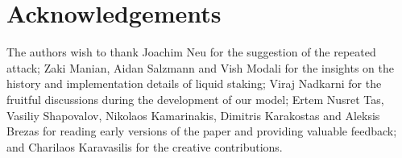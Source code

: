 \section{Acknowledgements}

The authors wish to thank Joachim Neu for the suggestion of the repeated attack;
Zaki Manian, Aidan Salzmann and Vish Modali for the insights on the history and
implementation details of liquid staking;
Viraj Nadkarni for the fruitful discussions during the
development of our model; Ertem Nusret Tas, Vasiliy Shapovalov,
Nikolaos Kamarinakis, Dimitris Karakostas and Aleksis Brezas for reading
early versions of the paper and providing valuable feedback; and Charilaos Karavasilis
for the creative contributions.
